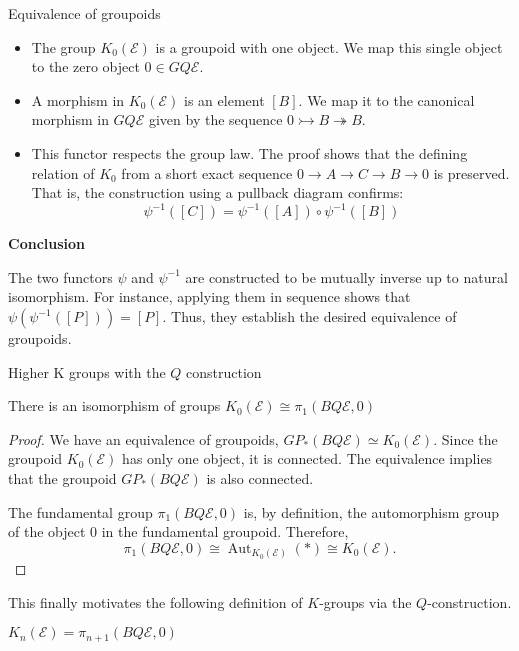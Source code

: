 \documentclass[10pt]{beamer}
\begin{document}
\begin{frame}{Equivalence of groupoids}
	\begin{itemize}
		\item The group $K_0(\mathcal{E})$ is a groupoid with one object. We map this single object to the zero object $0 \in GQ\mathcal{E}$.
		
		\item A morphism in $K_0(\mathcal{E})$ is an element $[B]$. We map it to the canonical morphism in $GQ\mathcal{E}$ given by the sequence $0 \rightarrowtail B \twoheadrightarrow B$.
		
		\item This functor respects the group law. The proof shows that the defining relation of $K_0$ from a short exact sequence $0 \to A \to C \to B \to 0$ is preserved. That is, the construction using a pullback diagram confirms:
		\[ \psi^{-1}([C]) = \psi^{-1}([A]) \circ \psi^{-1}([B]) \]
		
	\end{itemize}
	
	
	
	\textbf{Conclusion}
	
	The two functors $\psi$ and $\psi^{-1}$ are constructed to be mutually inverse up to natural isomorphism. For instance, applying them in sequence shows that $\psi(\psi^{-1}([P])) = [P]$. Thus, they establish the desired equivalence of groupoids.
	\hfill 
	
	
\end{frame}
\begin{frame}{Higher K groups with the \( Q \) construction}
		\begin{corollary}
		There is an isomorphism of groups \( K_0(\mathcal{E}) \cong \pi_1(BQ\mathcal{E},0) \)
	\end{corollary}
	\begin{proof}
		We have an equivalence of groupoids,
		\(  GP_*(BQ \mathcal{E}) \simeq K_0(\mathcal{E}). \)
		Since the groupoid $K_0(\mathcal{E})$ has only one object, it is connected. The equivalence implies that the groupoid $GP_*(BQ\mathcal{E})$ is also connected.
		
		The fundamental group $\pi_1(BQ\mathcal{E}, 0)$ is, by definition, the automorphism group of the object $0$ in the fundamental groupoid. Therefore,
		\[ \pi_1(BQ\mathcal {E}, 0) \cong \operatorname{Aut}_{K_0(\mathcal{E})}(*) \cong K_0(\mathcal{E}). \]
	\end{proof}
	
	This finally motivates the following definition of \( K \)-groups via the \( Q \)-construction.
	\begin{definition}
		\(K_n(\mathcal{E})= \pi_{n+1}(BQ\mathcal{E},0)\)
	\end{definition}
\end{frame}
\end{document}
